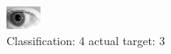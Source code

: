 \begin{figure}[h!]
\begin{center}
\includegraphics[width=0.60\columnwidth]{figures/ID330_class_4_target_3.png}
\end{center}
\caption{ Classification: 4 actual target: 3}
\label{fig:ID330_class_4_target_3}
\end{figure}
